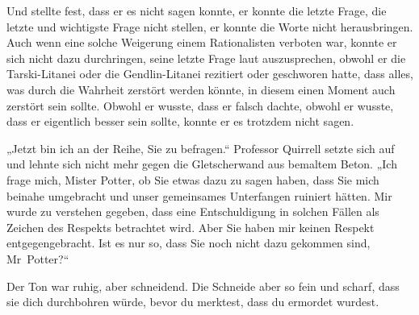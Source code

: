 Und stellte fest, dass er es nicht sagen konnte, er konnte die letzte Frage, die letzte und wichtigste Frage nicht stellen, er konnte die Worte nicht herausbringen. Auch wenn eine solche Weigerung einem Rationalisten verboten war, konnte er sich nicht dazu durchringen, seine letzte Frage laut auszusprechen, obwohl er die Tarski-Litanei oder die Gendlin-Litanei rezitiert oder geschworen hatte, dass alles, was durch die Wahrheit zerstört werden könnte, in diesem einen Moment auch zerstört sein sollte. Obwohl er wusste, dass er falsch dachte, obwohl er wusste, dass er eigentlich besser sein sollte, konnte er es trotzdem nicht sagen.

„Jetzt bin ich an der Reihe, Sie zu befragen.“ Professor Quirrell setzte sich auf und lehnte sich nicht mehr gegen die Gletscherwand aus bemaltem Beton. „Ich frage mich, Mister Potter, ob Sie etwas dazu zu sagen haben, dass Sie mich beinahe umgebracht und unser gemeinsames Unterfangen ruiniert hätten. Mir wurde zu verstehen gegeben, dass eine Entschuldigung in solchen Fällen als Zeichen des Respekts betrachtet wird. Aber Sie haben mir keinen Respekt entgegengebracht. Ist es nur so, dass Sie noch nicht dazu gekommen sind, Mr~Potter?“

Der Ton war ruhig, aber schneidend. Die Schneide aber so fein und scharf, dass sie dich durchbohren würde, bevor du merktest, dass du ermordet wurdest.

